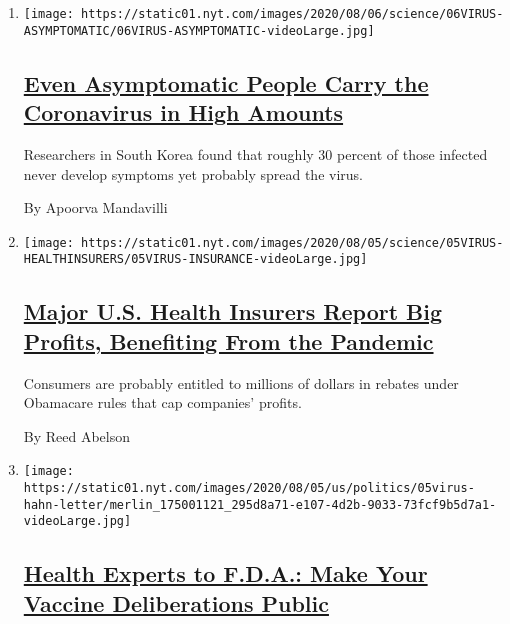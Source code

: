 \begin{enumerate}
\def\labelenumi{\arabic{enumi}.}
\item
  \texttt{[image: https://static01.nyt.com/images/2020/08/06/science/06VIRUS-ASYMPTOMATIC/06VIRUS-ASYMPTOMATIC-videoLarge.jpg]}

  \hypertarget{even-asymptomatic-people-carry-the-coronavirus-in-high-amounts}{%
  \subsection{\texorpdfstring{\href{/2020/08/06/health/coronavirus-asymptomatic-transmission.html}{Even
  Asymptomatic People Carry the Coronavirus in High
  Amounts}}{Even Asymptomatic People Carry the Coronavirus in High Amounts}}\label{even-asymptomatic-people-carry-the-coronavirus-in-high-amounts}}

  Researchers in South Korea found that roughly 30 percent of those
  infected never develop symptoms yet probably spread the virus.

  By Apoorva Mandavilli
\item
  \texttt{[image: https://static01.nyt.com/images/2020/08/05/science/05VIRUS-HEALTHINSURERS/05VIRUS-INSURANCE-videoLarge.jpg]}

  \hypertarget{major-us-health-insurers-report-big-profits-benefiting-from-the-pandemic}{%
  \subsection{\texorpdfstring{\href{/2020/08/05/health/covid-insurance-profits.html}{Major
  U.S. Health Insurers Report Big Profits, Benefiting From the
  Pandemic}}{Major U.S. Health Insurers Report Big Profits, Benefiting From the Pandemic}}\label{major-us-health-insurers-report-big-profits-benefiting-from-the-pandemic}}

  Consumers are probably entitled to millions of dollars in rebates
  under Obamacare rules that cap companies' profits.

  By Reed Abelson
\item
  \texttt{[image: https://static01.nyt.com/images/2020/08/05/us/politics/05virus-hahn-letter/merlin\_175001121\_295d8a71-e107-4d2b-9033-73fcf9b5d7a1-videoLarge.jpg]}

  \hypertarget{health-experts-to-fda-make-your-vaccine-deliberations-public}{%
  \subsection{\texorpdfstring{\href{/2020/08/05/health/covid-19-vaccine-fda.html}{Health
  Experts to F.D.A.: Make Your Vaccine Deliberations
  Public}}{Health Experts to F.D.A.: Make Your Vaccine Deliberations Public}}\label{health-experts-to-fda-make-your-vaccine-deliberations-public}}


\end{enumerate}
